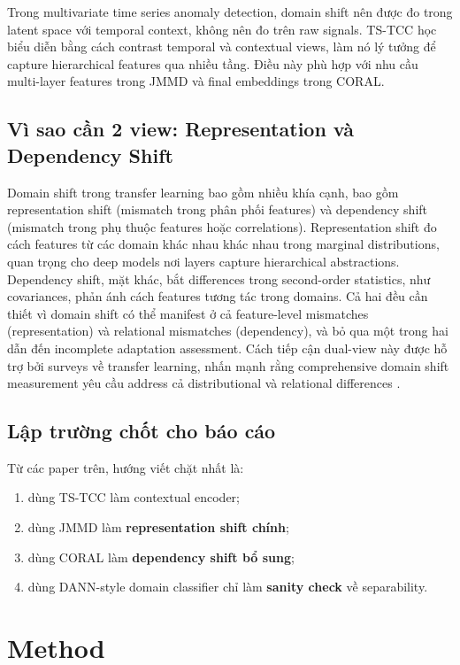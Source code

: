 \documentclass[a4paper]{article}
\begin{document}
Trong multivariate time series anomaly detection, domain shift nên được đo trong latent space với temporal context, không nên đo trên raw signals. TS-TCC \cite{tstcc} học biểu diễn bằng cách contrast temporal và contextual views, làm nó lý tưởng để capture hierarchical features qua nhiều tầng. Điều này phù hợp với nhu cầu multi-layer features trong JMMD và final embeddings trong CORAL.

\subsection{Vì sao cần 2 view: Representation và Dependency Shift}

Domain shift trong transfer learning bao gồm nhiều khía cạnh, bao gồm representation shift (mismatch trong phân phối features) và dependency shift (mismatch trong phụ thuộc features hoặc correlations). Representation shift đo cách features từ các domain khác nhau khác nhau trong marginal distributions, quan trọng cho deep models nơi layers capture hierarchical abstractions. Dependency shift, mặt khác, bắt differences trong second-order statistics, như covariances, phản ánh cách features tương tác trong domains. Cả hai đều cần thiết vì domain shift có thể manifest ở cả feature-level mismatches (representation) và relational mismatches (dependency), và bỏ qua một trong hai dẫn đến incomplete adaptation assessment. Cách tiếp cận dual-view này được hỗ trợ bởi surveys về transfer learning, nhấn mạnh rằng comprehensive domain shift measurement yêu cầu address cả distributional và relational differences \cite{pan2010survey}.

\subsection{Lập trường chốt cho báo cáo}

Từ các paper trên, hướng viết chặt nhất là:
\begin{enumerate}[label=\arabic*.]
    \item dùng TS-TCC làm contextual encoder;
    \item dùng JMMD làm \textbf{representation shift chính};
    \item dùng CORAL làm \textbf{dependency shift bổ sung};
    \item dùng DANN-style domain classifier chỉ làm \textbf{sanity check} về separability.
\end{enumerate}

\section{Method}
\end{document}
